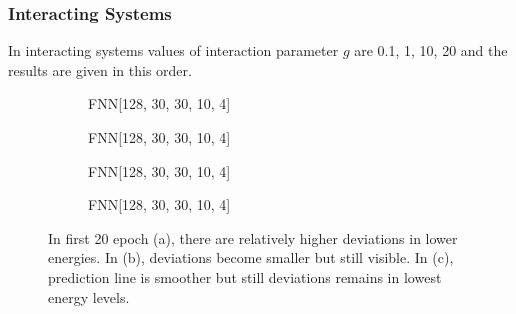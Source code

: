 \documentclass[a4paper,times,12pt]{article}
\begin{document}
\subsubsection{Interacting Systems}

In interacting systems values of interaction parameter $g$ are 0.1, 1, 10, 20 and the results are given in this order. 

\begin{figure}[H]
    \centering
    \begin{subfigure}[t]{0.45\textwidth}
		\centering
        
        \caption{FNN[128, 30, 30, 10, 4]}
		\label{fig:a}
    \end{subfigure}\hfill
    \begin{subfigure}[t]{0.45\textwidth}
		\centering
        
        \caption{FNN[128, 30, 30, 10, 4]}
		\label{fig:b}
    \end{subfigure}\hfill    
    \begin{subfigure}[t]{0.45\textwidth}
        \centering
        
        \caption{FNN[128, 30, 30, 10, 4]}
		\label{fig:c}
    \end{subfigure}\hfill
    \begin{subfigure}[t]{0.45\textwidth}
        \centering
        
        \caption{FNN[128, 30, 30, 10, 4]}
		\label{fig:c}
    \end{subfigure}
	\caption{In first 20 epoch (a), there are relatively higher deviations in lower energies. In (b), deviations become smaller but still visible. In (c), prediction line is smoother but still deviations remains in lowest energy levels.}
\end{figure}
\end{document}
